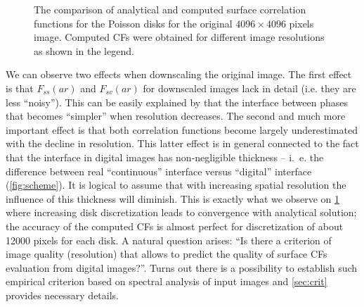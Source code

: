 \documentclass[reprint,amsmath,amssymb,aps,pre]{revtex4-1}
\begin{document}
\begin{figure}[ht]
  \centering
  \hfill
    \caption[]{The comparison of analytical and computed surface correlation
      functions for the Poisson disks for the original $4096 \times 4096$ pixels
      image. Computed CFs were obtained for different image resolutions as shown
      in the legend.}
    \label{fig:scaling}
\end{figure}

We can observe two effects when downscaling the original image. The
first effect is that $F_{ss}(ar)$ and $F_{sv}(ar)$ for downscaled images lack in
detail (i.e. they are less ``noisy''). This can be easily explained by that the
interface between phases that becomes ``simpler'' when resolution decreases. The
second and much more important effect is that both correlation functions become
largely underestimated with the decline in resolution. This latter effect is in
general connected to the fact that the interface in digital images has
non-negligible thickness -- i.~e. the difference between real ``continuous''
interface versus ``digital'' interface (\cref{fig:scheme}). It is logical to
assume that with increasing spatial resolution the influence of this thickness
will diminish. This is exactly what we observe on \cref{fig:scaling} where
increasing disk discretization leads to convergence with analytical solution;
the accuracy of the computed CFs is almost perfect for discretization of about
12000 pixels for each disk. A natural question arises: ``Is there a criterion of
image quality (resolution) that allows to predict the quality of surface CFs
evaluation from digital images?''. Turns out there is a possibility to establish
such empirical criterion based on spectral analysis of input images and
\cref{sec:crit} provides necessary details.
\end{document}
